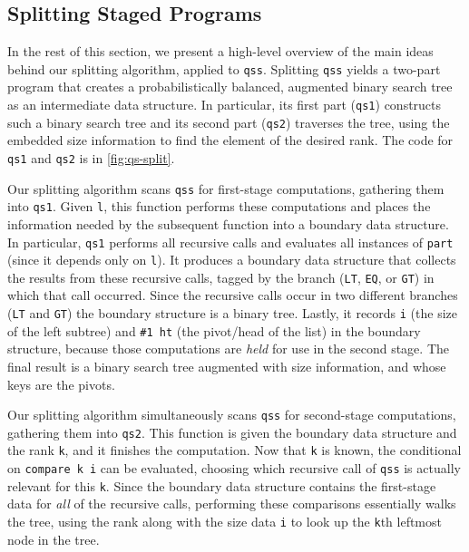 \begin{abstrsyn}
\subsection{Splitting Staged Programs}



In the rest of this section, we present a high-level overview of the main ideas
behind our splitting algorithm, applied to \texttt{qss}.
%
Splitting \texttt{qss} yields a two-part program that creates a
probabilistically balanced, augmented binary search tree 
as an intermediate data structure. In
particular, its first part (\texttt{qs1}) constructs such a binary search tree
and its second part (\texttt{qs2}) traverses the tree, using the embedded size
information to find the element of the desired rank.
%
The code for \texttt{qs1} and \texttt{qs2} is in \ref{fig:qs-split}.


Our splitting algorithm scans \texttt{qss} for first-stage computations,
gathering them into \texttt{qs1}. Given \texttt{l}, this function performs these
computations and places the information needed by the subsequent function into a
boundary data structure.
%
In particular, \texttt{qs1} performs all recursive calls and evaluates all
instances of \texttt{part} (since it depends only on \texttt{l}). It
produces a boundary data structure that collects the results from these
recursive calls, tagged by the branch (\texttt{LT}, \texttt{EQ}, or \texttt{GT})
in which that call occurred. Since the recursive calls occur in two different
branches (\texttt{LT} and \texttt{GT}) the boundary structure is a binary tree.  
%
Lastly, it records \texttt{i} (the size of the left subtree) and \texttt{\#1 ht}
(the pivot/head of the list) in the boundary structure, because those
computations are \emph{held} for use in the second stage.
%
The final result is a binary search tree augmented with size information, and
whose keys are the pivots.

Our splitting algorithm simultaneously scans \texttt{qss} for second-stage
computations, gathering them into \texttt{qs2}. This function is given the boundary
data structure and the rank \texttt{k}, and it finishes the computation. Now that
\texttt{k} is known, the conditional on \texttt{compare k i} can be evaluated,
choosing which recursive call of \texttt{qss} is actually relevant for this
\texttt{k}. Since the boundary data structure contains the first-stage data for
\emph{all} of the recursive calls, performing these comparisons essentially
walks the tree, using the rank along with the size data \texttt{i} to
look up the \texttt{k}th leftmost node in the tree.


\end{abstrsyn}

